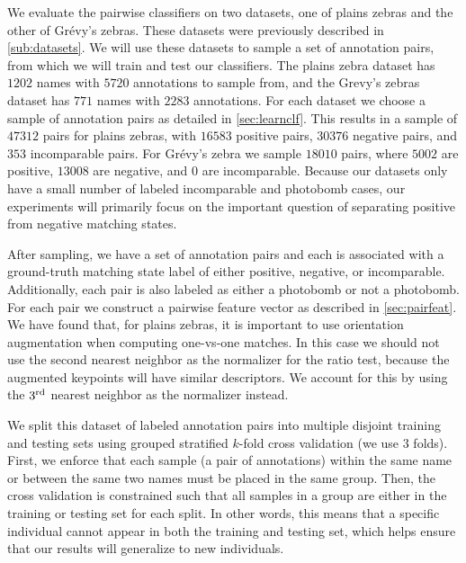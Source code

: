     We evaluate the pairwise classifiers on two datasets, one of plains zebras and the other of Grévy's zebras.
    These datasets were previously described in \cref{sub:datasets}.
    We will use these datasets to sample a set of annotation pairs, from which we will train and test our
      classifiers.
    The plains zebra dataset has  $1202$ names with $5720$ annotations to sample from, and the Grevy's zebras
      dataset has $771$ names with $2283$ annotations.
    For each dataset we choose a sample of annotation pairs as detailed in \cref{sec:learnclf}.
    This results in a sample of $47312$ pairs for plains zebras, with $16583$ positive pairs, $30376$ negative
      pairs, and $353$ incomparable pairs.
    For Grévy's zebra we sample $18010$ pairs, where $5002$ are positive, $13008$ are negative, and $0$ are
      incomparable.
    Because our datasets only have a small number of labeled incomparable and photobomb cases, our experiments
      will primarily focus on the important question of separating positive from negative matching states.

    After sampling, we have a set of annotation pairs and each is associated with a ground-truth matching state
      label of either positive, negative, or incomparable.
    Additionally, each pair is also labeled as either a photobomb or not a photobomb.
    For each pair we construct a pairwise feature vector as described in \cref{sec:pairfeat}.
    We have found that, for plains zebras, it is important to use orientation augmentation when computing
      one-vs-one matches.
    In this case we should not use the second nearest neighbor as the normalizer for the ratio test, because the
      augmented keypoints will have similar descriptors.
    We account for this by using the $3^{\textrm{rd}}$ nearest neighbor as the normalizer instead.

    We split this dataset of labeled annotation pairs into multiple disjoint training and testing sets using
    grouped stratified $k$-fold cross validation (we use $3$ folds). First, we enforce that each sample (a pair of
    annotations) within the same name or between the same two names must be placed in the same group. Then, the
    cross validation is constrained such that all samples in a group are either in the training or testing set for
    each split. In other words, this means that a specific individual cannot appear in both the training and
    testing set, which helps ensure that our results will generalize to new individuals.

